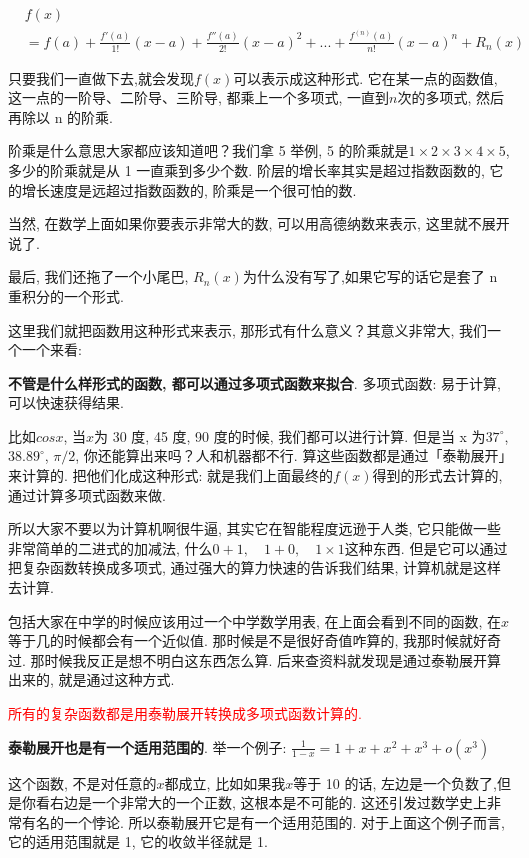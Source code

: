 \begin{align*}
  & f(x) \\
  & = f(a) + \frac{f'(a)}{1!}(x-a) + \frac{f''(a)}{2!}(x-a)^2+...+\frac{f^{(n)}(a)}{n!}(x-a)^n+R_n(x)
\end{align*}

只要我们一直做下去,就会发现$f(x)$可以表示成这种形式. 它在某一点的函数值, 这一点的一阶导、二阶导、三阶导, 都乘上一个多项式, 一直到$n$次的多项式, 然后再除以 n 的阶乘. 

阶乘是什么意思大家都应该知道吧？我们拿 5 举例,  5 的阶乘就是$1\times 2 \times 3 \times 4 \times 5$, 多少的阶乘就是从 1 一直乘到多少个数. 阶层的增长率其实是超过指数函数的, 它的增长速度是远超过指数函数的, 阶乘是一个很可怕的数. 

当然, 在数学上面如果你要表示非常大的数, 可以用高德纳数来表示, 这里就不展开说了. 

最后, 我们还拖了一个小尾巴, $R_n(x)$为什么没有写了,如果它写的话它是套了 n 重积分的一个形式. 

这里我们就把函数用这种形式来表示, 那形式有什么意义？其意义非常大, 我们一个一个来看: 

\textbf{不管是什么样形式的函数, 都可以通过多项式函数来拟合}. 多项式函数: 易于计算, 可以快速获得结果. 

比如$cosx$,  当$x$为 30 度, 45 度, 90 度的时候, 我们都可以进行计算. 但是当 x 为$37^\circ$, $38.89^\circ$, $\pi/2$, 你还能算出来吗？人和机器都不行. 算这些函数都是通过「泰勒展开」来计算的. 把他们化成这种形式: 就是我们上面最终的$f(x)$得到的形式去计算的, 通过计算多项式函数来做. 

所以大家不要以为计算机啊很牛逼, 其实它在智能程度远逊于人类, 它只能做一些非常简单的二进式的加减法, 什么$0+1, \quad 1+0, \quad 1\times 1$这种东西. 但是它可以通过把复杂函数转换成多项式, 通过强大的算力快速的告诉我们结果, 计算机就是这样去计算. 

包括大家在中学的时候应该用过一个中学数学用表, 在上面会看到不同的函数, 在$x$等于几的时候都会有一个近似值. 那时候是不是很好奇值咋算的, 我那时候就好奇过. 那时候我反正是想不明白这东西怎么算. 后来查资料就发现是通过泰勒展开算出来的, 就是通过这种方式. 

\textcolor{red}{所有的复杂函数都是用泰勒展开转换成多项式函数计算的.}

\textbf{泰勒展开也是有一个适用范围的}. 举一个例子: $\frac{1}{1-x} = 1+x+x^2+x^3+o(x^3)$

这个函数, 不是对任意的$x$都成立, 比如如果我$x$等于 10 的话, 左边是一个负数了,但是你看右边是一个非常大的一个正数, 这根本是不可能的. 这还引发过数学史上非常有名的一个悖论. 所以泰勒展开它是有一个适用范围的. 对于上面这个例子而言, 它的适用范围就是 1, 它的收敛半径就是 1. 

